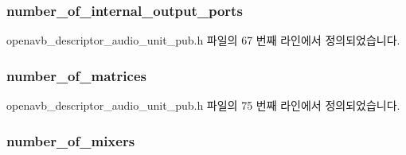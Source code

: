 \subsubsection[{\texorpdfstring{number\+\_\+of\+\_\+internal\+\_\+output\+\_\+ports}{number_of_internal_output_ports}}]{ number\+\_\+of\+\_\+internal\+\_\+output\+\_\+ports}\hypertarget{structopenavb__aem__descriptor__audio__unit__t_adc7644381dfb19a9553afa7843bd100d}{}\label{structopenavb__aem__descriptor__audio__unit__t_adc7644381dfb19a9553afa7843bd100d}


openavb\+\_\+descriptor\+\_\+audio\+\_\+unit\+\_\+pub.\+h 파일의 67 번째 라인에서 정의되었습니다.

\subsubsection[{\texorpdfstring{number\+\_\+of\+\_\+matrices}{number_of_matrices}}]{ number\+\_\+of\+\_\+matrices}\hypertarget{structopenavb__aem__descriptor__audio__unit__t_a6da1a8a718233e7570499d42c3ee0f25}{}\label{structopenavb__aem__descriptor__audio__unit__t_a6da1a8a718233e7570499d42c3ee0f25}


openavb\+\_\+descriptor\+\_\+audio\+\_\+unit\+\_\+pub.\+h 파일의 75 번째 라인에서 정의되었습니다.

\subsubsection[{\texorpdfstring{number\+\_\+of\+\_\+mixers}{number_of_mixers}}]{ number\+\_\+of\+\_\+mixers}\hypertarget{structopenavb__aem__descriptor__audio__unit__t_ad31e497d2ae31d1dc7c1e35e406dd246}{}\label{structopenavb__aem__descriptor__audio__unit__t_ad31e497d2ae31d1dc7c1e35e406dd246}


